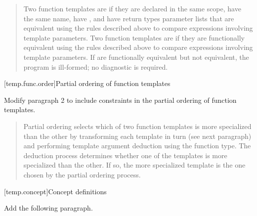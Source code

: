 \begin{quote}
\setcounter{Paras}{6}
\pnum
Two function templates are  if they are 
declared in the same scope, have the same name,
have 
,
and have return types\added{,} 
parameter lists
that are equivalent using the rules described above to compare expressions 
involving template parameters.
%
Two function templates are  if they
are functionally equivalent using the rules described above to compare 
expressions involving template parameters.
% 
If 
are 
functionally equivalent but not equivalent, the program is ill-formed; 
no diagnostic is required.
\end{quote}



[temp.func.order]{Partial ordering of function templates}

Modify paragraph 2 to include constraints in the partial ordering
of function templates.

\begin{quote}
\setcounter{Paras}{1}
\pnum
Partial ordering selects which of two function templates is 
more specialized than the other by transforming each template 
in turn (see next paragraph) and performing template argument 
deduction using the function type. The deduction process 
determines whether one of the templates is more specialized 
than the other.
% 
If so, the more specialized template is the one chosen by the 
partial ordering process. 
% 
\end{quote}

[temp.concept]{Concept definitions}

Add the following paragraph.

